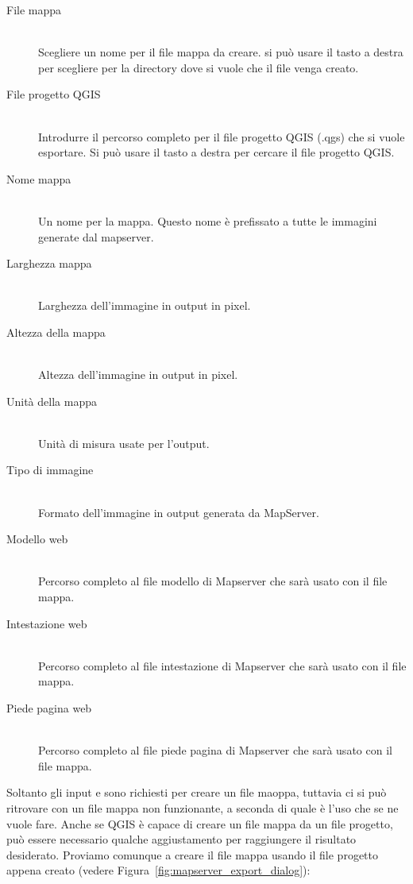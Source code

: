 \begin{description}
\item [File mappa] \mbox{}\\
Scegliere un nome per il file mappa da creare. si può usare il tasto a destra per scegliere per la directory dove si vuole che il file venga creato. 
\item [File progetto QGIS] \mbox{}\\
Introdurre il percorso completo per il file progetto QGIS (.qgs) che si vuole esportare. Si può usare il tasto a destra per cercare il file progetto QGIS.
\item [Nome mappa] \mbox{}\\
Un nome per la mappa. Questo nome è prefissato a tutte le immagini generate dal mapserver.
\item [Larghezza mappa] \mbox{}\\
Larghezza dell'immagine in output in pixel.
\item [Altezza della mappa] \mbox{}\\
Altezza dell'immagine in output in pixel.
\item [Unità della mappa] \mbox{}\\
Unità di misura usate per l'output.
\item [Tipo di immagine] \mbox{}\\
Formato dell'immagine in output generata da MapServer.
\item [Modello web] \mbox{}\\
Percorso completo al file modello di Mapserver che sarà usato con il file mappa.
\item [Intestazione web] \mbox{}\\
Percorso completo al file intestazione di Mapserver che sarà usato con il file mappa.
\item [Piede pagina web] \mbox{}\\
Percorso completo al file piede pagina di Mapserver che sarà usato con il file mappa.
\end{description}

Soltanto gli input  e  sono richiesti per creare un file maoppa, tuttavia ci si può ritrovare con un file mappa non funzionante, a seconda di quale è l'uso che se ne vuole fare. Anche se QGIS è capace di creare un file mappa da un file progetto, può essere necessario qualche aggiustamento per raggiungere il risultato desiderato. Proviamo comunque a creare il file mappa usando il file progetto 
 appena creato 
(vedere Figura~\ref{fig:mapserver_export_dialog}):

